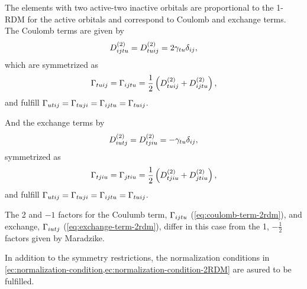 The elements with two active-two inactive orbitals are proportional to the
1-RDM for the active orbitals and correspond to Coulomb and exchange terms.
The Coulomb terms are given by
\begin{equation} \label{eq:coulomb-term-2rdm}
    D^{\left( 2 \right)}_{ijtu} = D^{\left( 2 \right)}_{tuij} = 2 \gamma_{tu} \delta_{ij},
\end{equation}
which are symmetrized as 
\begin{equation}
    \Gamma_{tuij} = \Gamma_{ijtu} =
    \frac{1}{2} \left( D^{\left( 2 \right)}_{tuij} + D^{\left( 2 \right)}_{ijtu} \right)
    ,
\end{equation}
and fulfill
$\Gamma_{utij} = \Gamma_{tuji} = \Gamma_{ijtu} = \Gamma_{tuij}$.

And the exchange terms by
\begin{equation} \label{eq:exchange-term-2rdm}
    D^{\left( 2 \right)}_{iutj} = D^{\left( 2 \right)}_{tjiu} = - \gamma_{tu} \delta_{ij}
    ,
\end{equation}
symmetrized as
\begin{equation}
    \Gamma_{tjiu} = \Gamma_{jtiu} =
    \frac{1}{2} \left( D^{\left( 2 \right)}_{tjiu} + D^{\left( 2 \right)}_{jtiu} \right)
    ,
\end{equation}
and fulfill
$\Gamma_{utij} = \Gamma_{tuji} = \Gamma_{ijtu} = \Gamma_{tuij}$.

The 2 and $-1$ factors for the Coulumb term, $\Gamma_{ijtu}$ (\cref{eq:coulomb-term-2rdm}),
and exchange, $\Gamma_{iutj}$ (\cref{eq:exchange-term-2rdm}), differ in this
case from the 1, $-\frac{1}{2}$ factors given by Maradzike.

In addition to the symmetry restrictions, the normalization conditions in
\cref{ec:normalization-condition,ec:normalization-condition-2RDM} are asured
to be fulfilled.
